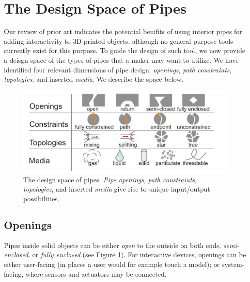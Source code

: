 
\section{The Design Space of Pipes}
Our review of prior art indicates the potential benifits of using interior pipes for adding interactivity to 3D printed objects, although no general purpose tools currently exist for this purpose. To guide the design of such tool, we now provide a deisgn space of the types of pipes that a maker may want to utilize. We have identified four relevant dimensions of pipe design: \emph{openings}, \emph{path constraints}, \emph{topologies}, and inserted \emph{media}.  We describe the space below.

\begin{figure}[t]
\centering
    \includegraphics[width=1.0\columnwidth]{figures/tubespace.pdf}
\caption{The design space of pipes.  \emph{Pipe openings}, \emph{path constraints}, \emph{topologies}, and inserted \emph{media} give rise to unique input/output possibilities.}
\label{fig:pipespace}
\end{figure}

\subsection{Openings}
Pipes inside solid objects can be either \emph{open} to the outside on both ends, \emph{semi-enclosed}, or \emph{fully enclosed} (see Figure \ref{fig:pipespace}). For interactive devices, openings can be either user-facing (in places a user would for example touch a model); or system-facing, where sensors and actuators may be connected.

